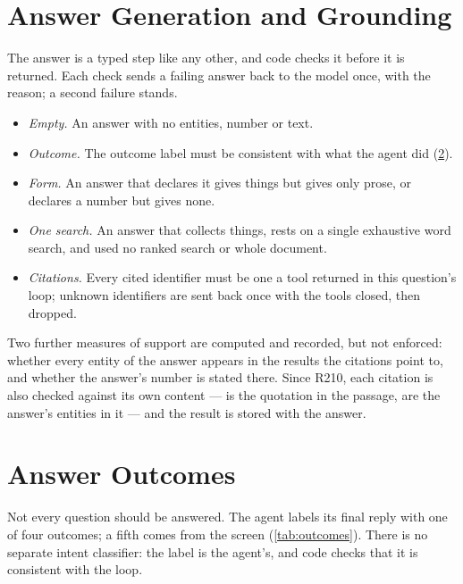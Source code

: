 \section{Answer Generation and Grounding}\label{sec:ch06-checks}

The answer is a typed step like any other, and code checks it before it is returned. Each check sends a failing
answer back to the model once, with the reason; a second failure stands.
\begin{itemize}[nosep]
\item \emph{Empty.} An answer with no entities, number or text.
\item \emph{Outcome.} The outcome label must be consistent with what the agent did (\cref{sec:ch06-outcomes}).
\item \emph{Form.} An answer that declares it gives things but gives only prose, or declares a number but gives
none.
\item \emph{One search.} An answer that collects things, rests on a single exhaustive word search, and used no
ranked search or whole document.
\item \emph{Citations.} Every cited identifier must be one a tool returned in this question's loop; unknown
identifiers are sent back once with the tools closed, then dropped.
\end{itemize}
Two further measures of support are computed and recorded, but not enforced: whether every entity of the answer
appears in the results the citations point to, and whether the answer's number is stated there. Since R210, each
citation is also checked against its own content --- is the quotation in the passage, are the answer's entities
in it --- and the result is stored with the answer.

\section{Answer Outcomes}\label{sec:ch06-outcomes}

Not every question should be answered. The agent labels its final reply with one of four outcomes; a fifth comes
from the screen (\cref{tab:outcomes}). There is no separate intent classifier: the label is the agent's, and code
checks that it is consistent with the loop.

